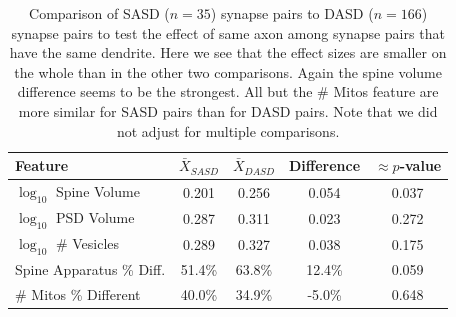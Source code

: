 \documentclass[12pt]{article}
\theoremstyle{definition}
\begin{document}






\begin{table}[tb]
  \caption{Comparison of SASD ($n=35$) synapse pairs to DASD ($n=166$) synapse pairs to test the effect of same axon among synapse pairs that have the same dendrite.
  Here we see that the effect sizes are smaller on the whole than in the other two comparisons. Again the spine volume difference seems to be the strongest.
  All but the \# Mitos feature are more similar for SASD pairs than for DASD pairs.
  Note that we did not adjust for multiple comparisons. }
  \label{tab:sasdVSdasd}
  \begin{center}
    \begin{tabular}{l|cccc}
    \hline

    \hline
Feature                  & $\bar{X}_{SASD}$ & $\bar{X}_{DASD}$ & Difference & $\approx p$-value  \\
    \hline
$\log_{10}$ Spine Volume & 0.201 & 0.256 & 0.054 & 0.037 \\
$\log_{10}$ PSD Volume   & 0.287 & 0.311 & 0.023 & 0.272 \\
$\log_{10}$ \# Vesicles  & 0.289 & 0.327 & 0.038 & 0.175 \\
Spine Apparatus \% Diff. & 51.4\% & 63.8\%& 12.4\% & 0.059 \\
\# Mitos \% Different    & 40.0\% & 34.9\% & -5.0\% & 0.648 \\
    \hline
    \end{tabular}
  \end{center}
\end{table}



\end{document}
